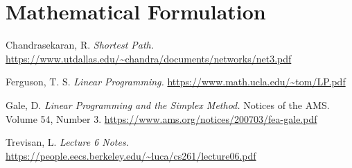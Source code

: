 \documentclass[12pt]{article}
\begin{document}
\section{Mathematical Formulation}


\begin{thebibliography}{9}

Chandrasekaran, R. 
\textit{Shortest Path.} 
\url{https://www.utdallas.edu/~chandra/documents/networks/net3.pdf}

Ferguson, T. S.
\textit{Linear Programming.}
\url{https://www.math.ucla.edu/~tom/LP.pdf}

Gale, D.
\textit{Linear Programming and the Simplex Method.}
Notices of the AMS. 
Volume 54, Number 3.
\url{https://www.ams.org/notices/200703/fea-gale.pdf}

Trevisan, L.
\textit{Lecture 6 Notes.}
\url{https://people.eecs.berkeley.edu/~luca/cs261/lecture06.pdf}

\end{thebibliography}
\end{document}
